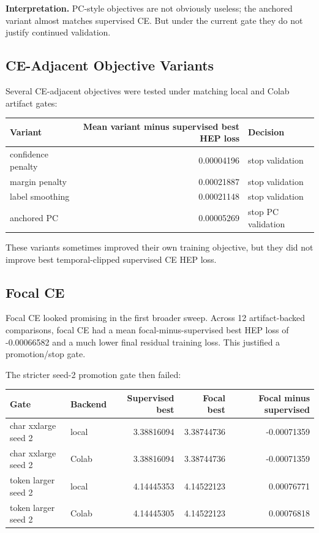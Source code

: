\documentclass[11pt]{article}
\begin{document}
\textbf{Interpretation.} PC-style objectives are not obviously useless; the
anchored variant almost matches supervised CE. But under the current gate they
do not justify continued validation.

\subsection{CE-Adjacent Objective Variants}

Several CE-adjacent objectives were tested under matching local and Colab
artifact gates:

\begin{center}
\begin{tabular}{l r l}
\hline
Variant & Mean variant minus supervised best HEP loss & Decision \\
\hline
confidence penalty & 0.00004196 & stop validation \\
margin penalty & 0.00021887 & stop validation \\
label smoothing & 0.00021148 & stop validation \\
anchored PC & 0.00005269 & stop PC validation \\
\hline
\end{tabular}
\end{center}

These variants sometimes improved their own training objective, but they did
not improve best temporal-clipped supervised CE HEP loss.

\subsection{Focal CE}

Focal CE looked promising in the first broader sweep. Across 12 artifact-backed
comparisons, focal CE had a mean focal-minus-supervised best HEP loss of
-0.00066582 and a much lower final residual training loss. This justified a
promotion/stop gate.

The stricter seed-2 promotion gate then failed:

\begin{center}
\begin{tabular}{l l r r r}
\hline
Gate & Backend & Supervised best & Focal best & Focal minus supervised \\
\hline
char xxlarge seed 2 & local & 3.38816094 & 3.38744736 & -0.00071359 \\
char xxlarge seed 2 & Colab & 3.38816094 & 3.38744736 & -0.00071359 \\
token larger seed 2 & local & 4.14445353 & 4.14522123 & 0.00076771 \\
token larger seed 2 & Colab & 4.14445305 & 4.14522123 & 0.00076818 \\
\hline
\end{tabular}
\end{center}
\end{document}

